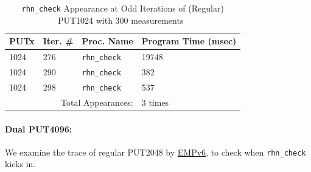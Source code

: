 \documentclass[10pt]{article}
\begin{document}
\begin{table}[htp!]
\centering
{
 \begin{tabular}{|l|l|l|l|} \hline
PUTx & Iter. \# & Proc. Name & Program Time (msec)\\ \hline
1024 & 276 & {\tt rhn\_check} & 19748 \\ \hline
1024 & 290 & {\tt rhn\_check} & 382 \\ \hline
1024 & 298 & {\tt rhn\_check} & 537 \\ \hline
\multicolumn{3}{|r|}{Total Appearances:} & 3 times\\ \hline
  \end{tabular}
  }
 \caption{{\tt rhn\_check} Appearance at Odd Iterations of (Regular) PUT1024 with 300 measurements~\label{fig:rc_reg_put_1024_odd}}
\end{table}

\pagebreak
\paragraph{Dual PUT4096:}
We examine the trace of regular PUT2048 by \underline{EMPv6}, to check when {\tt rhn\_check} kicks in. 
\end{document}

